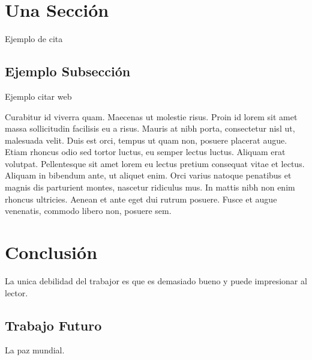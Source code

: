 \documentclass[a4paper,12pt]{article}
\begin{document}
\section{Una Sección}

Ejemplo de cita\cite{turing1936a}

\subsection{Ejemplo Subsección}

Ejemplo citar web\cite{famaf-cover}

Curabitur id viverra quam. Maecenas ut molestie risus. Proin id lorem sit amet massa sollicitudin facilisis eu a risus. Mauris at nibh porta, consectetur nisl ut, malesuada velit. Duis est orci, tempus ut quam non, posuere placerat augue. Etiam rhoncus odio sed tortor luctus, eu semper lectus luctus. Aliquam erat volutpat. Pellentesque sit amet lorem eu lectus pretium consequat vitae et lectus. Aliquam in bibendum ante, ut aliquet enim. Orci varius natoque penatibus et magnis dis parturient montes, nascetur ridiculus mus. In mattis nibh non enim rhoncus ultricies. Aenean et ante eget dui rutrum posuere. Fusce et augue venenatis, commodo libero non, posuere sem.

\section{Conclusión}

La unica debilidad del trabajor es que es demasiado bueno y puede impresionar al lector.

\subsection{Trabajo Futuro}

La paz mundial.

\printbibliography
\end{document}
